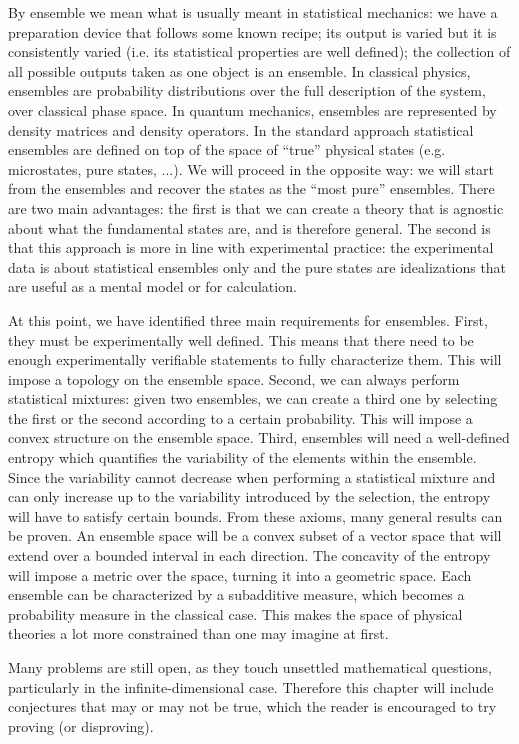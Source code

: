 By ensemble we mean what is usually meant in statistical mechanics: we have a preparation device that follows some known recipe; its output is varied but it is consistently varied (i.e. its statistical properties are well defined); the collection of all possible outputs taken as one object is an ensemble. In classical physics, ensembles are probability distributions over the full description of the system, over classical phase space. In quantum mechanics, ensembles are represented by density matrices and density operators. In the standard approach statistical ensembles are defined on top of the space of ``true'' physical states (e.g. microstates, pure states, ...). We will proceed in the opposite way: we will start from the ensembles and recover the states as the ``most pure'' ensembles. There are two main advantages: the first is that we can create a theory that is agnostic about what the fundamental states are, and is therefore general. The second is that this approach is more in line with experimental practice: the experimental data is about statistical ensembles only and the pure states are idealizations that are useful as a mental model or for calculation.

At this point, we have identified three main requirements for ensembles. First, they must be experimentally well defined. This means that there need to be enough experimentally verifiable statements to fully characterize them. This will impose a topology on the ensemble space. Second, we can always perform statistical mixtures: given two ensembles, we can create a third one by selecting the first or the second according to a certain probability. This will impose a convex structure on the ensemble space. Third, ensembles will need a well-defined entropy which quantifies the variability of the elements within the ensemble. Since the variability cannot decrease when performing a statistical mixture and can only increase up to the variability introduced by the selection, the entropy will have to satisfy certain bounds. From these axioms, many general results can be proven. An ensemble space will be a convex subset of a vector space that will extend over a bounded interval in each direction. The concavity of the entropy will impose a metric over the space, turning it into a geometric space. Each ensemble can be characterized by a subadditive measure, which becomes a probability measure in the classical case. This makes the space of physical theories a lot more constrained than one may imagine at first.

Many problems are still open, as they touch unsettled mathematical questions, particularly in the infinite-dimensional case. Therefore this chapter will include conjectures that may or may not be true, which the reader is encouraged to try proving (or disproving).

